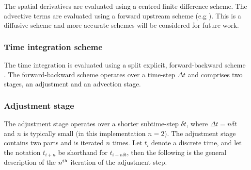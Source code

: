 \documentclass[times]{qjrms4}
\begin{document}
The spatial derivatives are evaluated using a centred finite difference scheme.
The advective terms are evaluated using a forward upstream scheme (e.g \cite{num_rec}).  
This is a diffusive scheme and more accurate schemes will be considered for future work.  

\subsubsection{Time integration scheme}

The time integration is evaluated using a split explicit, forward-backward scheme \citep{cullen_spex}.  
The forward-backward scheme operates over a time-step $\Delta t$ and comprises two stages, an
adjustment and an advection stage.

\subsubsection*{Adjustment stage}

The adjustment stage operates over a shorter subtime-step $\delta t$, where $\Delta t = n \delta t$ and
$n$ is typically small (in this implementation $n=2$).  
The adjustment stage contains two parts and is iterated $n$ times. 
Let $t_i$ denote a discrete time, and let the notation $t_{i+n}$ be shorthand for $t_{i + n\delta t}$, 
then the following is the general description of the $n^{\rm {th}}$ iteration of the adjustment step. 
\end{document}
